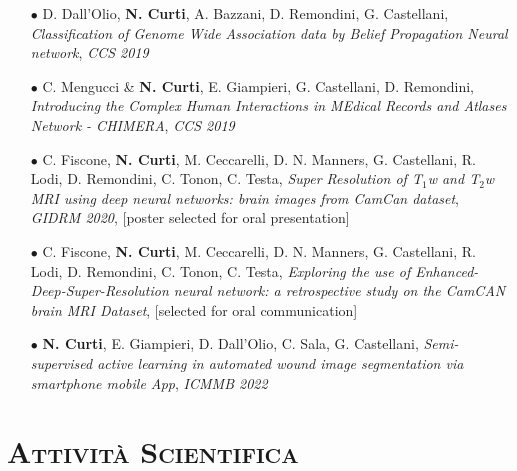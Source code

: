 \documentclass[a4paper,11pt]{article}
\begin{document}
\begin{itemize}

  \item[$\bullet$] D. Dall'Olio, \textbf{N. Curti}, A. Bazzani, D. Remondini, G. Castellani, \emph{Classification of Genome Wide Association data by Belief Propagation Neural network}, \emph{CCS 2019}

  \item[$\bullet$] C. Mengucci \& \textbf{N. Curti}, E. Giampieri, G. Castellani, D. Remondini, \emph{Introducing the Complex Human Interactions in MEdical Records and Atlases Network - CHIMERA}, \emph{CCS 2019}

  \item[$\bullet$] C. Fiscone, \textbf{N. Curti}, M. Ceccarelli, D. N. Manners, G. Castellani, R. Lodi, D. Remondini, C. Tonon, C. Testa, \emph{Super Resolution of T$_1$w and T$_2$w MRI using deep neural networks: brain images from CamCan dataset}, \emph{GIDRM 2020}, [poster selected for oral presentation]

  \item[$\bullet$] C. Fiscone, \textbf{N. Curti}, M. Ceccarelli, D. N. Manners, G. Castellani, R. Lodi, D. Remondini, C. Tonon, C. Testa, \emph{Exploring the use of Enhanced-Deep-Super-Resolution neural network: a retrospective study on the CamCAN brain MRI Dataset}, [selected for oral communication]

  \item[$\bullet$] \textbf{N. Curti}, E. Giampieri, D. Dall'Olio, C. Sala, G. Castellani, \emph{Semi-supervised active learning in automated wound image segmentation via smartphone mobile App}, \emph{ICMMB 2022}

\end{itemize}




\vspace*{0.5cm}
\section*{\scshape{Attività Scientifica}}
\end{document}
